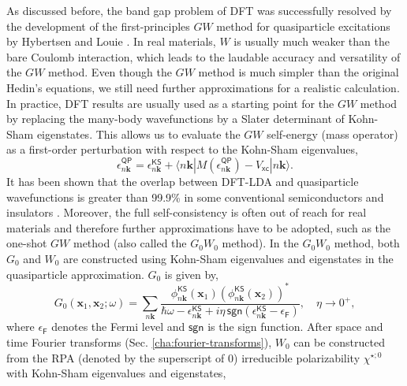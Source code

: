 \documentclass[11pt, oneside]{article}          %
\begin{document}
As discussed before, the band gap problem of DFT was successfully resolved by the development of the first-principles $GW$ method for quasiparticle excitations by Hybertsen and Louie \cite{hybertsen1986electron, hybertsen1985firstprinciples}. In real materials, $W$ is usually much weaker than the bare Coulomb interaction, which leads to the laudable accuracy and versatility of the $GW$ method. Even though the $GW$ method is much simpler than the original Hedin's equations, we still need further approximations for a realistic calculation. In practice, DFT results are usually used as a starting point for the $GW$ method by replacing the many-body wavefunctions by a Slater determinant of Kohn-Sham eigenstates. This allows us to evaluate the $GW$ self-energy (mass operator) as a first-order perturbation with respect to the Kohn-Sham eigenvalues,
\begin{equation}
  \label{eq:GW_correction_perturbation}
  \epsilon^{\mathsf{QP}}_{n{\bm k}} = \epsilon^{\mathsf{KS}}_{n{\bm k}} + \langle n {\bm k} | M(\epsilon^{\mathsf{QP}}_{n {\bm k}}) - V_{\mathsf{xc}} | n {\bm k} \rangle.
\end{equation}
It has been shown that the overlap between DFT-LDA and quasiparticle wavefunctions is greater than 99.9\% in some conventional semiconductors and insulators \cite{hybertsen1986electron}. Moreover, the full self-consistency is often out of reach for real materials and therefore further approximations have to be adopted, such as the one-shot $GW$ method (also called the $G_0 W_0$ method). In the $G_0 W_0$ method, both $G_0$ and $W_0$ are constructed using Kohn-Sham eigenvalues and eigenstates in the quasiparticle approximation. $G_0$ is given by,
\begin{equation}
  \label{eq:G_GW_approximation}
  G_0({\bm x}_1, {\bm x}_2;\omega) = \sum_{n{\bm k}} \frac{\phi^{\mathsf{KS}}_{n {\bm k}}({\bm x}_1) (\phi^{\mathsf{KS}}_{n {\bm k}}({\bm x}_2))^{*} }{ \hbar \omega - \epsilon^{\mathsf{KS}}_{n {\bm k}} + i \eta \, \mathsf{sgn}(\epsilon^{\mathsf{KS}}_{n{\bm k}} - \epsilon_{\mathsf{F}}) }, \quad \eta \rightarrow 0^{+},
\end{equation}
where $\epsilon_{\mathsf{F}}$ denotes the Fermi level and $\mathsf{sgn}$ is the sign function. After space and time Fourier transforms (Sec. \ref{cha:fourier-transforms}), $W_0$ can be constructed from the RPA (denoted by the superscript of $0$) irreducible polarizability $\chi^{\star;0}$ with Kohn-Sham eigenvalues and eigenstates,
\end{document}

